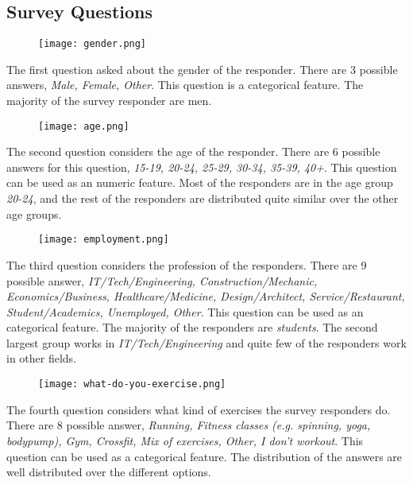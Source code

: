 \documentclass[a4paper]{article}
\begin{document}
\subsection{Survey Questions}

\begin{figure}[h]
\texttt{[image: gender.png]}\newline
\end{figure}

The first question asked about the gender of the responder. There are 3 possible answers, \textit{Male, Female, Other}. This question is a categorical feature. The majority of the survey responder are men. 


\begin{figure}[h]
\texttt{[image: age.png]}
\end{figure}


The second question considers the age of the responder. There are 6 possible answers for this question, \textit{15-19, 20-24, 25-29, 30-34, 35-39, 40+}. This question can be used as an numeric feature. Most of the responders are in the age group \textit{20-24}, and the rest of the responders are distributed quite similar over the other age groups.

\newpage


\begin{figure}[h]
\texttt{[image: employment.png]}
\end{figure}

The third question considers the profession of the responders. There are 9 possible answer, \textit{IT/Tech/Engineering, Construction/Mechanic, Economics/Business, Healthcare/Medicine, Design/Architect, Service/Restaurant, Student/Academics, Unemployed, Other}. This question can be used as an categorical feature. The majority of the responders are \textit{students}. The second largest group works in \textit{IT/Tech/Engineering} and quite few of the responders work in other fields.



\begin{figure}[h]
\texttt{[image: what-do-you-exercise.png]}
\end{figure}

The fourth question considers what kind of exercises the survey responders do. There are 8 possible answer, \textit{Running, Fitness classes (e.g. spinning, yoga, bodypump), Gym, Crossfit, Mix of exercises, Other, I don't workout}. This question can be used as a categorical feature. The distribution of the answers are well distributed over the different options.
\end{document}
